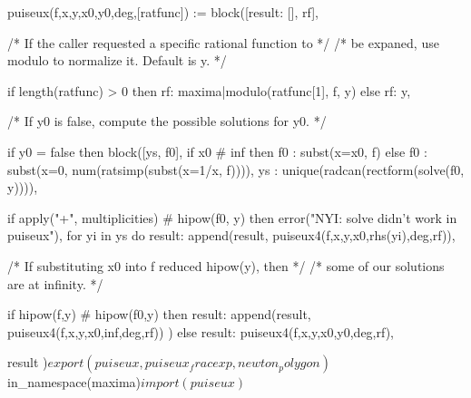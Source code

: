 \begin{maximablocksmall}
puiseux(f,x,y,x0,y0,deg,[ratfunc]) :=
 block([result: [], rf],

   /* If the caller requested a specific rational function to */
   /* be expaned, use modulo to normalize it.  Default is y. */

   if length(ratfunc) > 0 then
      rf: maxima|modulo(ratfunc[1], f, y)
   else
      rf: y,

   /* If y0 is false, compute the possible solutions for y0. */

   if y0 = false then block([ys, f0],
      if x0 # inf then
         f0 : subst(x=x0, f)
      else
         f0 : subst(x=0, num(ratsimp(subst(x=1/x, f)))),
      ys : unique(radcan(rectform(solve(f0, y)))),

      if apply("+", multiplicities) # hipow(f0, y) then
         error("NYI: solve didn't work in puiseux"),
      for yi in ys do
         result: append(result, puiseux4(f,x,y,x0,rhs(yi),deg,rf)),

      /* If substituting x0 into f reduced hipow(y), then */
      /* some of our solutions are at infinity. */

      if hipow(f,y) # hipow(f0,y) then
         result: append(result, puiseux4(f,x,y,x0,inf,deg,rf))
   ) else
      result: puiseux4(f,x,y,x0,y0,deg,rf),

   result
 )$

export(puiseux, puiseux_fracexp, newton_polygon)$
in_namespace(maxima)$
import(puiseux)$
\end{maximablocksmall}

